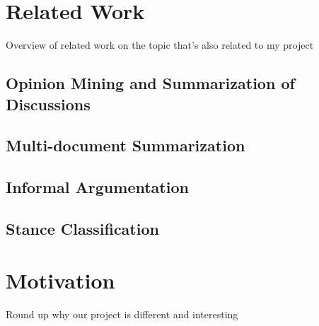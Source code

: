   \section{Related Work}
    Overview of related work on the topic that's also related to my project
    \subsection{Opinion Mining and Summarization of Discussions}
    \subsection{Multi-document Summarization}
    \subsection{Informal Argumentation}
    \subsection{Stance Classification}
  \section{Motivation}
    Round up why our project is different and interesting
